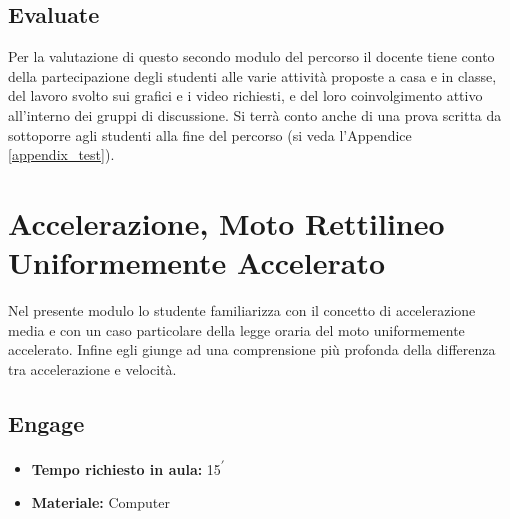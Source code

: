 \documentclass{report} \usepackage[T1]{fontenc} \usepackage[italian]{babel}
\begin{document}
\section{Evaluate}
Per la valutazione di questo secondo modulo del percorso il docente tiene conto della
partecipazione degli studenti alle varie attività proposte a casa e in classe,
del lavoro svolto sui grafici e i video richiesti, e del loro coinvolgimento attivo
all’interno dei gruppi di discussione.
Si terrà conto anche di una prova scritta da sottoporre agli
studenti alla fine del percorso
(si veda l'Appendice \ref{appendix_test}).

\chapter{Accelerazione, Moto Rettilineo Uniformemente Accelerato}\label{accelerazione}
Nel presente modulo lo studente familiarizza con il concetto di accelerazione
media e con un caso particolare della legge oraria del moto uniformemente accelerato.
Infine egli giunge ad una comprensione più profonda della differenza
tra accelerazione e velocità.

\section{Engage}

\begin{itemize}
\item \textbf{Tempo richiesto in aula:} 15\textsuperscript{$\prime$}
\item \textbf{Materiale:} Computer
\end{itemize}
\end{document}
